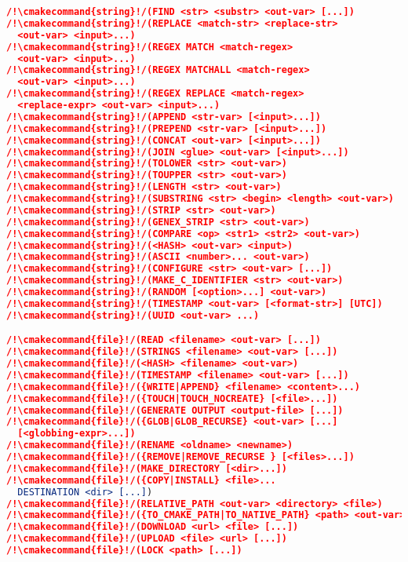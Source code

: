 \documentclass{article}
\newcommand{\cmakecommand}[1]{{\href{https://cmake.org/cmake/help/v3.20/command/#1.html}{#1}}}
\begin{document}
\begin{minipage}[t]{0.18\linewidth}
\begin{lstlisting}[language=CMake]
/!\cmakecommand{string}!/(FIND <str> <substr> <out-var> [...])
/!\cmakecommand{string}!/(REPLACE <match-str> <replace-str>
  <out-var> <input>...)
/!\cmakecommand{string}!/(REGEX MATCH <match-regex>
  <out-var> <input>...)
/!\cmakecommand{string}!/(REGEX MATCHALL <match-regex>
  <out-var> <input>...)
/!\cmakecommand{string}!/(REGEX REPLACE <match-regex>
  <replace-expr> <out-var> <input>...)
/!\cmakecommand{string}!/(APPEND <str-var> [<input>...])
/!\cmakecommand{string}!/(PREPEND <str-var> [<input>...])
/!\cmakecommand{string}!/(CONCAT <out-var> [<input>...])
/!\cmakecommand{string}!/(JOIN <glue> <out-var> [<input>...])
/!\cmakecommand{string}!/(TOLOWER <str> <out-var>)
/!\cmakecommand{string}!/(TOUPPER <str> <out-var>)
/!\cmakecommand{string}!/(LENGTH <str> <out-var>)
/!\cmakecommand{string}!/(SUBSTRING <str> <begin> <length> <out-var>)
/!\cmakecommand{string}!/(STRIP <str> <out-var>)
/!\cmakecommand{string}!/(GENEX_STRIP <str> <out-var>)
/!\cmakecommand{string}!/(COMPARE <op> <str1> <str2> <out-var>)
/!\cmakecommand{string}!/(<HASH> <out-var> <input>)
/!\cmakecommand{string}!/(ASCII <number>... <out-var>)
/!\cmakecommand{string}!/(CONFIGURE <str> <out-var> [...])
/!\cmakecommand{string}!/(MAKE_C_IDENTIFIER <str> <out-var>)
/!\cmakecommand{string}!/(RANDOM [<option>...] <out-var>)
/!\cmakecommand{string}!/(TIMESTAMP <out-var> [<format-str>] [UTC])
/!\cmakecommand{string}!/(UUID <out-var> ...)

/!\cmakecommand{file}!/(READ <filename> <out-var> [...])
/!\cmakecommand{file}!/(STRINGS <filename> <out-var> [...])
/!\cmakecommand{file}!/(<HASH> <filename> <out-var>)
/!\cmakecommand{file}!/(TIMESTAMP <filename> <out-var> [...])
/!\cmakecommand{file}!/({WRITE|APPEND} <filename> <content>...)
/!\cmakecommand{file}!/({TOUCH|TOUCH_NOCREATE} [<file>...])
/!\cmakecommand{file}!/(GENERATE OUTPUT <output-file> [...])
/!\cmakecommand{file}!/({GLOB|GLOB_RECURSE} <out-var> [...]
  [<globbing-expr>...])
/!\cmakecommand{file}!/(RENAME <oldname> <newname>)
/!\cmakecommand{file}!/({REMOVE|REMOVE_RECURSE } [<files>...])
/!\cmakecommand{file}!/(MAKE_DIRECTORY [<dir>...])
/!\cmakecommand{file}!/({COPY|INSTALL} <file>...
  DESTINATION <dir> [...])
/!\cmakecommand{file}!/(RELATIVE_PATH <out-var> <directory> <file>)
/!\cmakecommand{file}!/({TO_CMAKE_PATH|TO_NATIVE_PATH} <path> <out-var>)
/!\cmakecommand{file}!/(DOWNLOAD <url> <file> [...])
/!\cmakecommand{file}!/(UPLOAD <file> <url> [...])
/!\cmakecommand{file}!/(LOCK <path> [...])
\end{lstlisting}
\end{minipage}
\end{document}
